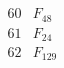 \documentclass{article}
\begin{document}
{$$\begin{array}{|r|*{7}{r|}}
\\
\hline
60 
 & F_{48} &
 & 
 & 
 & 
 & 
 & 
\\
\hline
61 
 & F_{24} &
 & 
 & 
 & 
 & 
 & 
\\
\hline
62 
 & F_{129} &
 & 
 & 
 & 

\end{array}$$}
\end{document}
